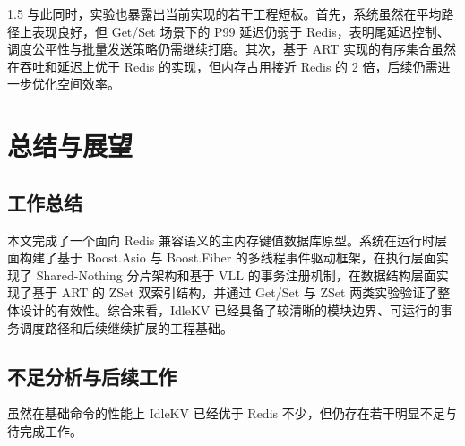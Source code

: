 \documentclass[a4paper,12pt,fontset=none,twoside]{article}
\numberwithin{figure}{section}
\numberwithin{equation}{section}
\numberwithin{table}{section}
\begin{document}
\begin{spacing}{1.5}
	与此同时，实验也暴露出当前实现的若干工程短板。首先，系统虽然在平均路径上表现良好，但 Get/Set 场景下的 P99 延迟仍弱于 Redis，表明尾延迟控制、调度公平性与批量发送策略仍需继续打磨。其次，基于 ART 实现的有序集合虽然在吞吐和延迟上优于 Redis 的实现，但内存占用接近 Redis 的 2 倍，后续仍需进一步优化空间效率。
	
	\section{总结与展望}
	\subsection{工作总结}
	本文完成了一个面向 Redis 兼容语义的主内存键值数据库原型。系统在运行时层面构建了基于 Boost.Asio 与 Boost.Fiber 的多线程事件驱动框架，在执行层面实现了 Shared-Nothing 分片架构和基于 VLL 的事务注册机制，在数据结构层面实现了基于 ART 的 ZSet 双索引结构，并通过 Get/Set 与 ZSet 两类实验验证了整体设计的有效性。综合来看，IdleKV 已经具备了较清晰的模块边界、可运行的事务调度路径和后续继续扩展的工程基础。

	\subsection{不足分析与后续工作}

	虽然在基础命令的性能上 IdleKV 已经优于 Redis 不少，但仍存在若干明显不足与待完成工作。


\end{spacing}
\end{document}
